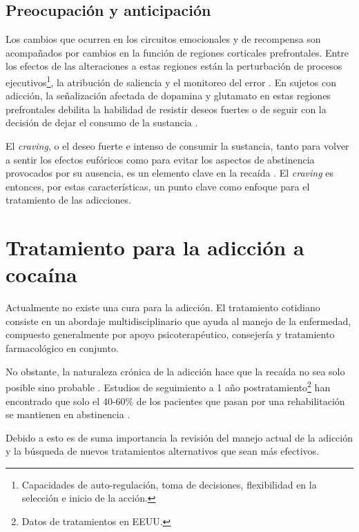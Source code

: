 \subsection{Preocupación y anticipación}
\label{crav}
Los cambios que ocurren en los circuitos emocionales y de recompensa son acompañados por cambios en la función de regiones corticales prefrontales.
Entre los efectos de las alteraciones a estas regiones están la perturbación de procesos ejecutivos\footnote{Capacidades de auto-regulación, toma de decisiones, flexibilidad en la selección e inicio de la acción.}, la atribución de saliencia y el monitoreo del error \parencite{Goldstein2012a,Volkow2016}.
En sujetos con adicción, la señalización afectada de dopamina y glutamato en estas regiones prefrontales debilita la habilidad de resistir deseos fuertes o de seguir con la decisión de dejar el consumo de la sustancia \parencite{Volkow2016}.\par
El \textit{craving}, o el deseo fuerte e intenso de consumir la sustancia, tanto para volver a sentir los efectos eufóricos como para evitar los aspectos de abstinencia provocados por su ausencia, es un elemento clave en la recaída \parencite{Koob2010a}.
El \textit{craving} es entonces, por estas características, un punto clave como enfoque para el tratamiento de las adicciones.

\section{Tratamiento para la adicción a cocaína}
Actualmente no existe una cura para la adicción.
El tratamiento cotidiano consiste en un abordaje multidisciplinario que ayuda al manejo de la enfermedad, compuesto generalmente por apoyo psicoterapéutico, consejería y tratamiento farmacológico en conjunto. \par
No obstante, la naturaleza crónica de la adicción hace que la recaída no sea solo posible sino probable \parencite{NIDA.}.
Estudios de seguimiento a 1 año postratamiento\footnote{Datos de tratamientos en EEUU.} han encontrado que solo el 40-60\% de los pacientes que pasan por una rehabilitación se mantienen en abstinencia \parencite{McLellan2000a}.\par
Debido a esto es de suma importancia la revisión del manejo actual de la adicción y la búsqueda de nuevos tratamientos alternativos que sean más efectivos.

